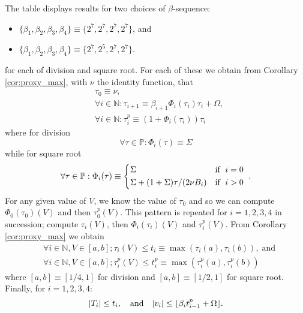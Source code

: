 \documentclass[10pt]{article}
\DeclarePairedDelimiter\floor{\lfloor}{\rfloor}
\theoremstyle{definition}
\theoremstyle{remark}
\numberwithin{equation}{section}
\newcommand{\nats}{\mathbb{N}}
\newcommand{\pee}{\mathbb{P}}
\newcommand{\abs}[1]{\lvert #1 \rvert}
\begin{document}
The table displays results for two choices of $\beta$-sequence:
\begin{itemize}[nosep]
	\item $\{\beta_1,\beta_2, \beta_3, \beta_4\} \equiv \{2^7,2^7,2^7,2^7\}$, and 
	\item $\{\beta_1,\beta_2, \beta_3, \beta_4\} \equiv \{2^7,2^5,2^7,2^7\}$.
\end{itemize}
for each of division and square root. For each of these we obtain from Corollary \ref{cor:proxy_max}, with $\nu$ the identity function, that
\begin{align*}
&\tau_0 \equiv \nu, \\
&\forall i \in \nats: \tau_{i+1} \equiv \beta_{i+1} \Phi_i(\tau_i) \tau_i + \Omega ,  \\[3pt]
&\forall i \in \nats: \tau_i^p \equiv (1+\Phi_i(\tau_i)) \tau_i 
\end{align*}
where for division
\[
\forall \tau \in \pee: \Phi_i(\tau) \equiv \Sigma
\]
while for square root
\[
\forall \tau \in \pee: \Phi_i(\tau) \equiv 
\begin{cases*}
\Sigma & \text{if}\; $i=0$ \\
\Sigma + (1+\Sigma)\tau/(2\nu B_i) & \text{if}\; $i > 0$
\end{cases*} .
\]
For any given value of $V$, we know the value of $\tau_0$ and so we can compute $\Phi_0(\tau_0)(V)$ and then $\tau^p_0(V)$. 
This pattern is repeated for $i=1,2,3,4$ in succession; compute $\tau_i(V)$, then $\Phi_i(\tau_i)(V)$ and $\tau_i^p(V)$. 
From Corollary \ref{cor:proxy_max} we obtain
\begin{align*}
&\forall i \in \nats, V \in [a,b]; \tau_i(V) \le t_i \equiv \max{(\tau_i(a),\tau_i(b))},  \;\text{and}\\
&\forall i \in \nats, V \in [a,b]; \tau_i^p(V) \le t^p_i \equiv \max{(\tau_i^p(a),\tau_i^p(b))}
\end{align*}
where $[a,b] \equiv [1/4,1]$ for division and $[a,b] \equiv [1/2,1]$ for square root. Finally, for $i = 1,2,3,4$:
\[
\abs{T_i} \le t_i, \quad\text{and}\quad
\abs{v_i} \le \floor{\beta_i t^p_{i-1} + \Omega} .
\]
\end{document}
